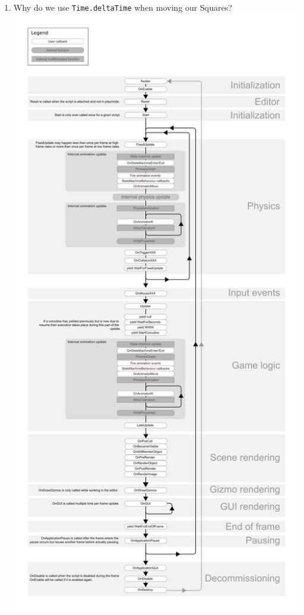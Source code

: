 \documentclass[12pt]{../rhitcsse}
\begin{document}
\begin{enumerate}
  \item Why do we use \texttt{Time.deltaTime} when moving our Squares?
  \vfill
  \clearpage
  \centering
  \includegraphics[height=\textheight]{../figs/monobehaviour_flowchart.png}
  
\end{enumerate}
\end{document}
